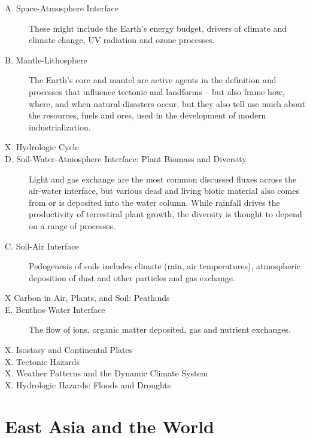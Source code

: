 \begin{description}
	\item[A. Space-Atmosphere Interface] These might include the Earth's energy budget, drivers of climate and climate change, UV radiation and ozone processes.
	
	\item[B. Mantle-Lithosphere] The Earth's core and mantel are active agents in the definition and processes that influence tectonic and landforms -- but also frame how, where, and when natural disasters occur, but they also tell use much about the resources, fuels and ores, used in the development of modern industrialization.  
	
	\item[X. Hydrologic Cycle]	
	
	\item[D. Soil-Water-Atmosphere Interface: Plant Biomass and Diversity] Light and gas exchange are the most common discussed fluxes across the air-water interface, but various dead and living biotic material also comes from or is deposited into the water column. While rainfall drives the productivity of terrestiral plant growth, the diversity is thought to depend on a range of processes.

	\item[C. Soil-Air Interface] Pedogenesis of soils includes climate (rain, air temperatures), atmospheric deposition of dust and other particles and gas exchange. 
	
	\item[X Carbon in Air, Plants, and Soil: Peatlands]
	
	\item[E. Benthos-Water Interface] The flow of ions, organic matter deposited, gas and nutrient exchanges.

	\item[X. Isostasy and Continental Plates]
	
	\item[X. Tectonic Hazards]
	
	\item[X. Weather Patterns and the Dynamic Climate System]
	
	\item[X. Hydrologic Hazards: Floods and Droughts]
	
\end{description}	

\section{East Asia and the World}